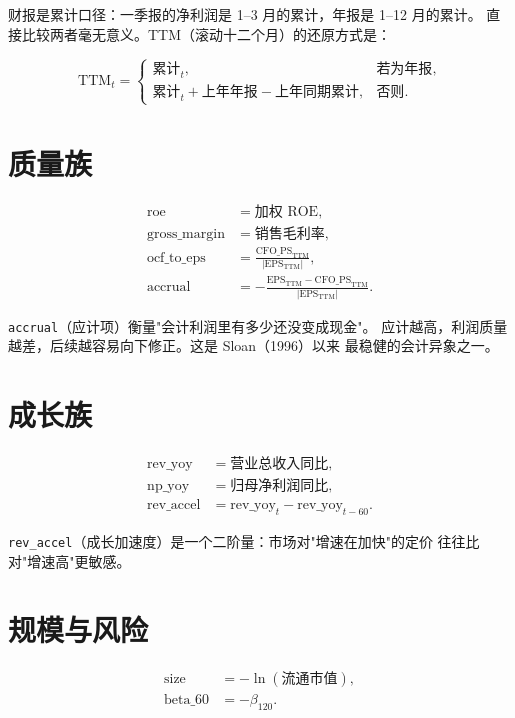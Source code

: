 财报是累计口径：一季报的净利润是 1--3 月的累计，年报是 1--12 月的累计。
直接比较两者毫无意义。TTM（滚动十二个月）的还原方式是：

\begin{equation}
  \text{TTM}_t =
  \begin{cases}
    \text{累计}_t, & \text{若为年报}, \\[4pt]
    \text{累计}_t + \text{上年年报} - \text{上年同期累计}, & \text{否则}.
  \end{cases}
  \label{eq:ttm}
\end{equation}

\section{质量族}

\begin{align}
  \text{roe} &= \text{加权 ROE}, \\
  \text{gross\_margin} &= \text{销售毛利率}, \\
  \text{ocf\_to\_eps} &= \frac{\text{CFO\_PS}_{\text{TTM}}}{|\text{EPS}_{\text{TTM}}|}, \\
  \text{accrual} &= -\frac{\text{EPS}_{\text{TTM}} - \text{CFO\_PS}_{\text{TTM}}}{|\text{EPS}_{\text{TTM}}|}.
\end{align}

\texttt{accrual}（应计项）衡量"会计利润里有多少还没变成现金"。
应计越高，利润质量越差，后续越容易向下修正。这是 Sloan（1996）以来
最稳健的会计异象之一。

\section{成长族}

\begin{align}
  \text{rev\_yoy} &= \text{营业总收入同比}, \\
  \text{np\_yoy} &= \text{归母净利润同比}, \\
  \text{rev\_accel} &= \text{rev\_yoy}_t - \text{rev\_yoy}_{t-60}.
\end{align}

\texttt{rev\_accel}（成长加速度）是一个二阶量：市场对"增速在加快"的定价
往往比对"增速高"更敏感。

\section{规模与风险}

\begin{align}
  \text{size} &= -\ln(\text{流通市值}), \\
  \text{beta\_60} &= -\beta_{120}.
\end{align}

